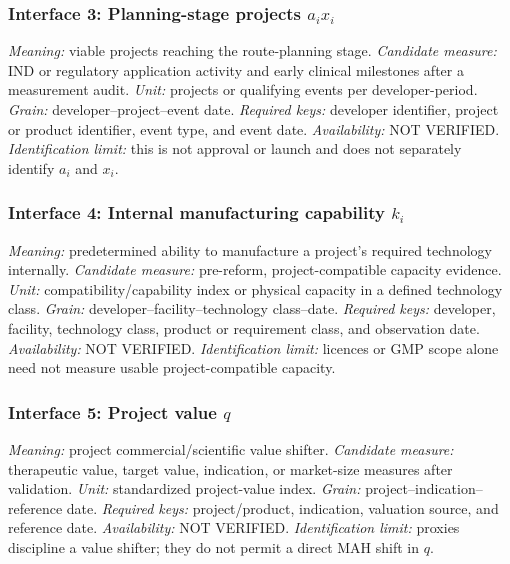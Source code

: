 \subsubsection{Interface 3: Planning-stage projects \texorpdfstring{\(a_ix_i\)}{a(i)x(i)}}
\textit{Meaning:} viable projects reaching the route-planning stage.
\textit{Candidate measure:} IND or regulatory application activity and early
clinical milestones after a measurement audit.
\textit{Unit:} projects or qualifying events per developer-period.
\textit{Grain:} developer--project--event date.
\textit{Required keys:} developer identifier, project or product identifier,
event type, and event date.
\textit{Availability:} NOT VERIFIED.
\textit{Identification limit:} this is not approval or launch and does not
separately identify \(a_i\) and \(x_i\).

\subsubsection{Interface 4: Internal manufacturing capability \texorpdfstring{\(k_i\)}{k(i)}}
\textit{Meaning:} predetermined ability to manufacture a project's required
technology internally.
\textit{Candidate measure:} pre-reform, project-compatible capacity evidence.
\textit{Unit:} compatibility/capability index or physical capacity in a
defined technology class.
\textit{Grain:} developer--facility--technology class--date.
\textit{Required keys:} developer, facility, technology class, product or
requirement class, and observation date.
\textit{Availability:} NOT VERIFIED.
\textit{Identification limit:} licences or GMP scope alone need not measure
usable project-compatible capacity.

\subsubsection{Interface 5: Project value \texorpdfstring{\(q\)}{project-value index}}
\textit{Meaning:} project commercial/scientific value shifter.
\textit{Candidate measure:} therapeutic value, target value, indication, or
market-size measures after validation.
\textit{Unit:} standardized project-value index.
\textit{Grain:} project--indication--reference date.
\textit{Required keys:} project/product, indication, valuation source, and
reference date.
\textit{Availability:} NOT VERIFIED.
\textit{Identification limit:} proxies discipline a value shifter; they do
not permit a direct MAH shift in \(q\).


